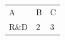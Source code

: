 \documentclass{article}
\begin{document}
\begin{tabular}{lll}A & B & C\\R\&D & 2 & 3\\\end{tabular}
\end{document}
